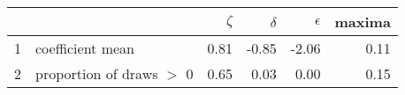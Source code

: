 \begin{table}[ht]
\centering
\begin{tabular}{rlrrrr}
  \hline
 &   & $\zeta$ & $\delta$ & $\epsilon$ & maxima \\ 
  \hline
1 & coefficient mean & 0.81 & -0.85 & -2.06 & 0.11 \\ 
  2 & proportion of draws $>$ 0 & 0.65 & 0.03 & 0.00 & 0.15 \\ 
   \hline
\end{tabular}
\end{table}
